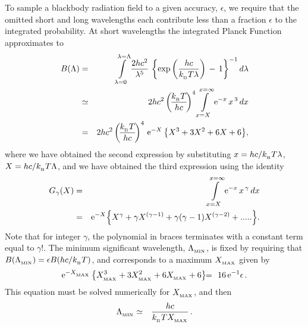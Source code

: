 \documentclass[usenatbib]{mn2e}
\numberwithin{equation}{section}
\begin{document}
To sample a blackbody radiation field to a given accuracy, $\epsilon$, we require that the omitted short and long wavelengths each contribute less than a fraction $\epsilon$ to the integrated probability. At short wavelengths the integrated Planck Function approximates to 
\begin{eqnarray}\nonumber
B(\Lambda)&=&\int\limits_{\lambda=0}^{\lambda=\Lambda}\frac{2hc^2}{\lambda^{5}}\,\left\{\exp\left(\frac{hc}{k_{_{\rm B}}T\lambda}\right)\,-\,1\right\}^{-1}d\lambda\\\nonumber
&\simeq&2hc^2\left(\!\frac{k_{_{\rm B}}T}{hc}\!\right)^4\int\limits_{x=X}^{x=\infty}{\rm e}^{-x}\,x^{\,3}\,dx\\
&=&2hc^2\left(\!\frac{k_{_{\rm B}}T}{hc}\!\right)^4\,{\rm e}^{-X}\left\{X^3+3X^2+6X+6\right\}\!,
\end{eqnarray}
where we have obtained the second expression by substituting $x=hc/k_{_{\rm B}}T\lambda$, $X=hc/k_{_{\rm B}}T\Lambda$, and we have obtained the third expression using the identity
\begin{eqnarray}\nonumber
G_\gamma(X)&=&\int\limits_{x=X}^{x=\infty}{\rm e}^{-x}\,x^{\,\gamma}\,dx\\\nonumber
&=&{\rm e}^{-X}\!\left\{X^\gamma+\gamma X^{(\gamma -1)}+\gamma(\gamma -1)X^{(\gamma -2)}+.....\right\}\!. \\
\end{eqnarray}
Note that for integer $\gamma$, the polynomial in braces terminates with a constant term equal to $\gamma!$. The minimum significant wavelength, $\Lambda_{_{\rm MIN}}$, is fixed by requiring that $B(\Lambda_{_{\rm MIN}})=\epsilon B(hc/k_{_{\rm B}}T)$, and corresponds to a maximum $X_{_{\rm MAX}}$ given by
\begin{eqnarray}
{\rm e}^{-X_{_{\rm MAX}}}\left\{X_{_{\rm MAX}}^3+3X_{_{\rm MAX}}^2+6X_{_{\rm MAX}}+6\right\}\!&\!=\!&\!16\,{\rm e}^{-1}\epsilon\,.
\end{eqnarray}
This equation must be solved numerically for $X_{_{\rm MAX}}$, and then
\begin{eqnarray}\label{EQN:LambdaMIN}
\Lambda_{_{\rm MIN}}&\simeq&\frac{hc}{k_{_{\rm B}}TX_{_{\rm MAX}}}\,.
\end{eqnarray}
\end{document}
